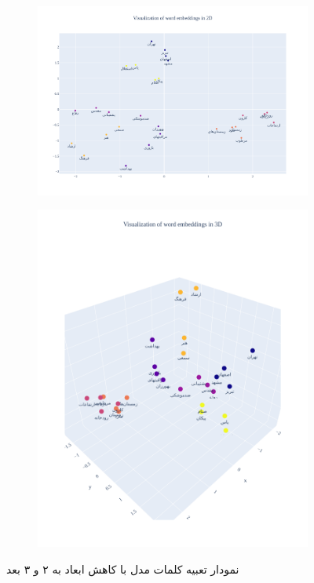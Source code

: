\documentclass[12pt, a4paper]{article}
\begin{document}
\begin{figure}
    \begin{subfigure}{0.45\linewidth}
        \includegraphics[width=\linewidth]{images/2d_embedding_similarity.png}
    \end{subfigure}
    \hfil
    \begin{subfigure}{0.45\linewidth}
        \includegraphics[width=\linewidth]{images/3d_embedding_similarity.png}
    \end{subfigure}
    \caption{نمودار تعبیه کلمات مدل با کاهش ابعاد به ۲ و ۳ بعد}
    \label{embedding_diagram}
\end{figure}
\end{document}
